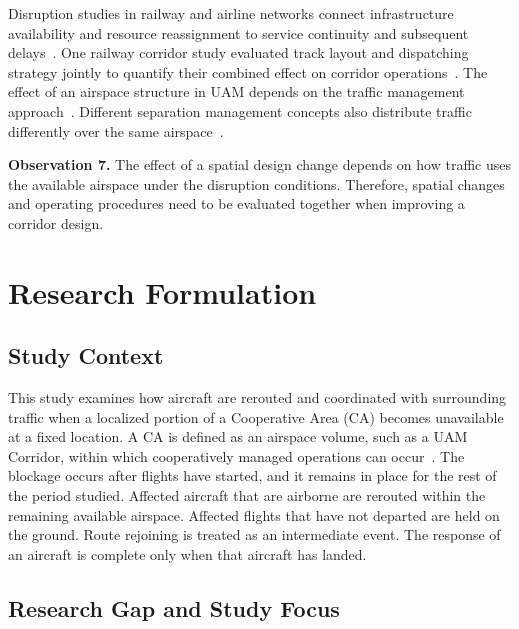\documentclass[11pt,letterpaper]{article}
\newcommand{\observation}[2]{\par\noindent\textbf{Observation #1.} #2\par}
\begin{document}
Disruption studies in railway and airline networks connect infrastructure availability and resource reassignment to service continuity and subsequent delays~\cite{Trommelen2022_L054,Zhu2019_L060,Suh2017_L004}. One railway corridor study evaluated track layout and dispatching strategy jointly to quantify their combined effect on corridor operations~\cite{Tosstorff2026_L046}. The effect of an airspace structure in UAM depends on the traffic management approach~\cite{Ramee2021_L028}. Different separation management concepts also distribute traffic differently over the same airspace~\cite{Veytia2022_L051}.

\observation{7}{The effect of a spatial design change depends on how traffic uses the available airspace under the disruption conditions. Therefore, spatial changes and operating procedures need to be evaluated together when improving a corridor design.}

\section{Research Formulation}
\label{sec:research-formulation}

\subsection{Study Context}
\label{sec:study-context}

This study examines how aircraft are rerouted and coordinated with surrounding traffic when a localized portion of a Cooperative Area (CA) becomes unavailable at a fixed location. A CA is defined as an airspace volume, such as a UAM Corridor, within which cooperatively managed operations can occur~\cite{FAA2023_L088}. The blockage occurs after flights have started, and it remains in place for the rest of the period studied. Affected aircraft that are airborne are rerouted within the remaining available airspace. Affected flights that have not departed are held on the ground. Route rejoining is treated as an intermediate event. The response of an aircraft is complete only when that aircraft has landed.

\subsection{Research Gap and Study Focus}
\label{sec:research-gap}
\end{document}
